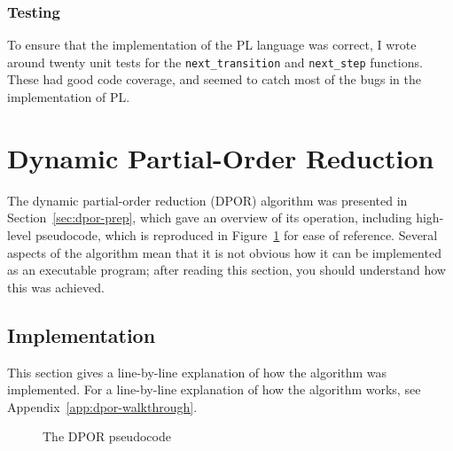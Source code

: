 \documentclass[12pt,a4paper,twoside,openright]{report}
\begin{document}
\subsubsection{Testing}
To ensure that the implementation of the PL
language was correct, I wrote around twenty unit tests for
the \texttt{next\_transition} and
\texttt{next\_step} functions. These had good
code coverage, and seemed to catch most of the bugs
in the implementation of PL.


\section{Dynamic Partial-Order Reduction}
The dynamic partial-order reduction (DPOR)
algorithm was presented in Section~\ref{sec:dpor-prep},
which gave an overview of its operation,
including high-level pseudocode, which is reproduced
in Figure~\ref{fig:dpor-imp-pscode} for ease
of reference. Several
aspects of the algorithm mean that it
is not obvious how it can be implemented
as an executable program; after reading
this section, you should understand
how this was achieved.

\subsection{Implementation}
This section gives a
line-by-line explanation of how the algorithm
was implemented.
For a line-by-line explanation of how the algorithm
works, see Appendix~\ref{app:dpor-walkthrough}.

\begin{figure}
	\dporpseudocode
	\caption{The DPOR pseudocode}
	\label{fig:dpor-imp-pscode}
\end{figure}
\end{document}
